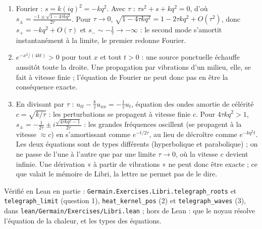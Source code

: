 \documentclass[11pt,a4paper]{article}
\begin{document}
\begin{solution}
\begin{enumerate}
\item Fourier : $s = k(iq)^2 = -kq^2$. Avec $\tau$ : $\tau s^2 + s + kq^2 = 0$, d'où
  $s_\pm = \frac{-1 \pm\sqrt{1 - 4\tau kq^2}}{2\tau}$. Pour $\tau \to 0$,
  $\sqrt{1 - 4\tau kq^2} = 1 - 2\tau kq^2 + O(\tau^2)$, donc
  $s_+ = -kq^2 + O(\tau)$ et $s_- \sim -\frac{1}{\tau} \to -\infty$ : le second mode
  s'amortit instantanément à la limite, le premier redonne Fourier.
\item $e^{-x^2/(4kt)} > 0$ pour tout $x$ et tout $t > 0$ : une source ponctuelle échauffe
  aussitôt toute la droite. Une propagation par vibrations d'un milieu, elle, se fait à
  vitesse finie ; l'équation de Fourier ne peut donc pas en être la conséquence exacte.
\item En divisant par $\tau$ : $u_{tt} - \frac{k}{\tau}u_{xx} = -\frac1\tau u_t$, équation
  des ondes amortie de célérité $c = \sqrt{k/\tau}$ : les perturbations se propagent à
  vitesse finie $c$. Pour $4\tau kq^2 > 1$, $s_\pm = -\frac{1}{2\tau} \pm
  i\frac{\sqrt{4\tau kq^2 - 1}}{2\tau}$ : les grandes fréquences oscillent (se propagent
  à la vitesse $\approx c$) en s'amortissant comme $e^{-t/2\tau}$, au lieu de décroître
  comme $e^{-kq^2t}$. Les deux équations sont de types différents (hyperbolique et
  parabolique) ; on ne passe de l'une à l'autre que par une limite $\tau \to 0$, où la
  vitesse $c$ devient infinie. Une dérivation « à partir de vibrations » ne peut donc
  être exacte ; ce que valait le mémoire de Libri, la lettre ne permet pas de le dire.
\end{enumerate}

Vérifié en Lean en partie : \texttt{Germain.Exercises.Libri.telegraph\_roots} et
\texttt{telegraph\_limit} (question 1), \texttt{heat\_kernel\_pos} (2) et
\texttt{telegraph\_waves} (3), dans \texttt{lean/Germain/Exercises/Libri.lean} ; hors de Lean : que le noyau résolve
l'équation de la chaleur, et les types des équations.
\end{solution}
\end{document}
